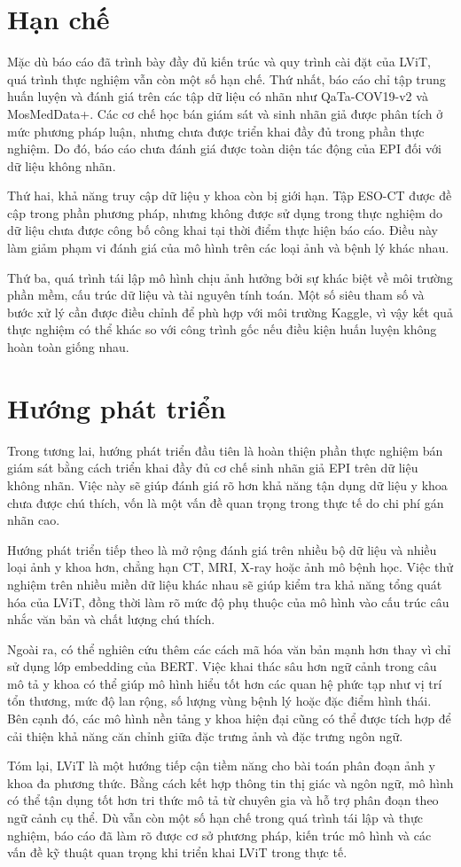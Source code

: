 \section{Hạn chế}

Mặc dù báo cáo đã trình bày đầy đủ kiến trúc và quy trình cài đặt của LViT, quá trình thực nghiệm vẫn còn một số hạn chế. Thứ nhất, báo cáo chỉ tập trung huấn luyện và đánh giá trên các tập dữ liệu có nhãn như QaTa-COV19-v2 và MosMedData+. Các cơ chế học bán giám sát và sinh nhãn giả được phân tích ở mức phương pháp luận, nhưng chưa được triển khai đầy đủ trong phần thực nghiệm. Do đó, báo cáo chưa đánh giá được toàn diện tác động của EPI đối với dữ liệu không nhãn.

Thứ hai, khả năng truy cập dữ liệu y khoa còn bị giới hạn. Tập ESO-CT được đề cập trong phần phương pháp, nhưng không được sử dụng trong thực nghiệm do dữ liệu chưa được công bố công khai tại thời điểm thực hiện báo cáo. Điều này làm giảm phạm vi đánh giá của mô hình trên các loại ảnh và bệnh lý khác nhau.

Thứ ba, quá trình tái lập mô hình chịu ảnh hưởng bởi sự khác biệt về môi trường phần mềm, cấu trúc dữ liệu và tài nguyên tính toán. Một số siêu tham số và bước xử lý cần được điều chỉnh để phù hợp với môi trường Kaggle, vì vậy kết quả thực nghiệm có thể khác so với công trình gốc nếu điều kiện huấn luyện không hoàn toàn giống nhau.

\section{Hướng phát triển}

Trong tương lai, hướng phát triển đầu tiên là hoàn thiện phần thực nghiệm bán giám sát bằng cách triển khai đầy đủ cơ chế sinh nhãn giả EPI trên dữ liệu không nhãn. Việc này sẽ giúp đánh giá rõ hơn khả năng tận dụng dữ liệu y khoa chưa được chú thích, vốn là một vấn đề quan trọng trong thực tế do chi phí gán nhãn cao.

Hướng phát triển tiếp theo là mở rộng đánh giá trên nhiều bộ dữ liệu và nhiều loại ảnh y khoa hơn, chẳng hạn CT, MRI, X-ray hoặc ảnh mô bệnh học. Việc thử nghiệm trên nhiều miền dữ liệu khác nhau sẽ giúp kiểm tra khả năng tổng quát hóa của LViT, đồng thời làm rõ mức độ phụ thuộc của mô hình vào cấu trúc câu nhắc văn bản và chất lượng chú thích.

Ngoài ra, có thể nghiên cứu thêm các cách mã hóa văn bản mạnh hơn thay vì chỉ sử dụng lớp embedding của BERT. Việc khai thác sâu hơn ngữ cảnh trong câu mô tả y khoa có thể giúp mô hình hiểu tốt hơn các quan hệ phức tạp như vị trí tổn thương, mức độ lan rộng, số lượng vùng bệnh lý hoặc đặc điểm hình thái. Bên cạnh đó, các mô hình nền tảng y khoa hiện đại cũng có thể được tích hợp để cải thiện khả năng căn chỉnh giữa đặc trưng ảnh và đặc trưng ngôn ngữ.

Tóm lại, LViT là một hướng tiếp cận tiềm năng cho bài toán phân đoạn ảnh y khoa đa phương thức. Bằng cách kết hợp thông tin thị giác và ngôn ngữ, mô hình có thể tận dụng tốt hơn tri thức mô tả từ chuyên gia và hỗ trợ phân đoạn theo ngữ cảnh cụ thể. Dù vẫn còn một số hạn chế trong quá trình tái lập và thực nghiệm, báo cáo đã làm rõ được cơ sở phương pháp, kiến trúc mô hình và các vấn đề kỹ thuật quan trọng khi triển khai LViT trong thực tế.